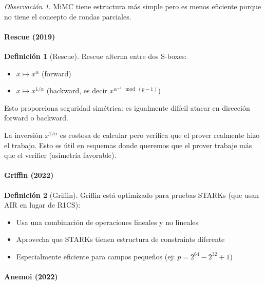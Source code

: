 \documentclass[11pt,a4paper,twoside,openright]{book}
\theoremstyle{definition}
\newtheorem{definition}{Definición}[chapter]
\theoremstyle{plain}
\theoremstyle{remark}
\newtheorem{remark}{Observación}[chapter]
\begin{document}
\begin{remark}
MiMC tiene estructura más simple pero es menos eficiente porque no tiene el concepto de rondas parciales.
\end{remark}

\paragraph{Rescue (2019)}

\begin{definition}[Rescue]
Rescue alterna entre dos S-boxes:
\begin{itemize}
    \item $x \mapsto x^\alpha$ (forward)
    \item $x \mapsto x^{1/\alpha}$ (backward, es decir $x^{\alpha^{-1} \mod (p-1)}$)
\end{itemize}

Esto proporciona seguridad simétrica: es igualmente difícil atacar en dirección forward o backward.
\end{definition}

\begin{mathnote}
La inversión $x^{1/\alpha}$ es costosa de calcular pero verifica que el prover realmente hizo el trabajo. Esto es útil en esquemas donde queremos que el prover trabaje más que el verifier (asimetría favorable).
\end{mathnote}

\paragraph{Griffin (2022)}

\begin{definition}[Griffin]
Griffin está optimizado para pruebas STARKs (que usan AIR en lugar de R1CS):
\begin{itemize}
    \item Usa una combinación de operaciones lineales y no lineales
    \item Aprovecha que STARKs tienen estructura de constraints diferente
    \item Especialmente eficiente para campos pequeños (ej: $p = 2^{64} - 2^{32} + 1$)
\end{itemize}
\end{definition}

\paragraph{Anemoi (2022)}
\end{document}
